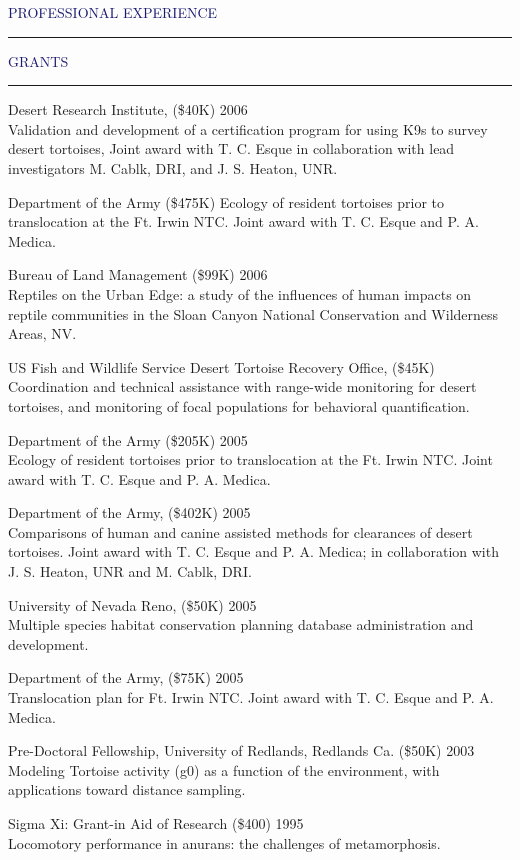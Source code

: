 \documentclass{resume} %
\renewenvironment{rSection}[1]{
\sectionskip
\textcolor{MidnightBlue}{\MakeUppercase{#1}}
\sectionlineskip
\hrule
\begin{list}{}{
\setlength{\leftmargin}{1.5em}
}
\item[]
}{
\end{list}
}
\begin{document}
\begin{rSection}{Professional Experience}
\begin{rSection}{Grants}{}
\item Desert Research Institute, (\$40K)  \hfill 2006 \\ 
Validation and development of a certification program for using K9s to survey desert tortoises, Joint award with T. C. Esque in collaboration with lead investigators M. Cablk, DRI, and J. S. Heaton, UNR.
\item Department of the Army (\$475K) Ecology of resident tortoises prior to translocation at the Ft. Irwin NTC. Joint award with T. C. Esque and P. A. Medica.
\item Bureau of Land Management (\$99K)   \hfill 2006 \\
Reptiles on the Urban Edge: a study of the influences of human impacts on reptile communities in the Sloan Canyon National Conservation and Wilderness Areas, NV.
\item US Fish and Wildlife Service Desert Tortoise Recovery Office, (\$45K) Coordination and technical assistance with range-wide monitoring for desert tortoises, and monitoring of focal populations for behavioral quantification.
\item Department of the Army (\$205K)   \hfill 2005 \\
Ecology of resident tortoises prior to translocation at the Ft. Irwin NTC. Joint award with T. C. Esque and P. A. Medica.
\item Department of the Army, (\$402K)   \hfill 2005 \\
Comparisons of human and canine assisted methods for clearances of desert tortoises. Joint award with T. C. Esque and P. A. Medica; in collaboration with J. S. Heaton, UNR and M. Cablk, DRI.
\item University of Nevada Reno, (\$50K)   \hfill 2005 \\
Multiple species habitat conservation planning database administration and development.
\item Department of the Army, (\$75K)   \hfill 2005 \\
Translocation plan for Ft. Irwin NTC. Joint award with T. C. Esque and P. A. Medica.
\item Pre-Doctoral Fellowship, University of Redlands, Redlands Ca. (\$50K)  \hfill 2003 \\ Modeling Tortoise activity (g0) as a function of the environment, with applications toward distance sampling.
\item Sigma Xi: Grant-in Aid of Research (\$400)  \hfill 1995 \\ 
Locomotory performance in anurans: the challenges of metamorphosis.


\end{rSection}
\end{rSection}
\end{document}
